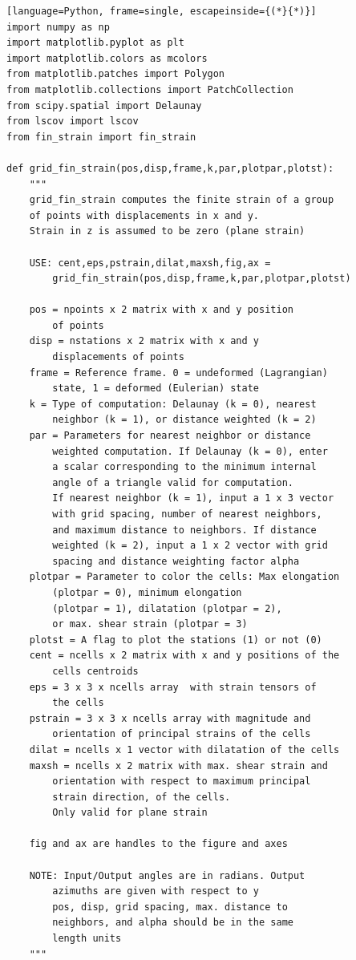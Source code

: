\documentclass[a4paper , 12pt]{book}
\begin{document}
\begin{center}
\begin{lstlisting}[language=Python, frame=single, escapeinside={(*}{*)}]
import numpy as np
import matplotlib.pyplot as plt
import matplotlib.colors as mcolors
from matplotlib.patches import Polygon
from matplotlib.collections import PatchCollection
from scipy.spatial import Delaunay
from lscov import lscov
from fin_strain import fin_strain

def grid_fin_strain(pos,disp,frame,k,par,plotpar,plotst):
	"""
	grid_fin_strain computes the finite strain of a group
	of points with displacements in x and y.
	Strain in z is assumed to be zero (plane strain)

	USE: cent,eps,pstrain,dilat,maxsh,fig,ax = 
		grid_fin_strain(pos,disp,frame,k,par,plotpar,plotst)

	pos = npoints x 2 matrix with x and y position
		of points
	disp = nstations x 2 matrix with x and y
		displacements of points
	frame = Reference frame. 0 = undeformed (Lagrangian)
		state, 1 = deformed (Eulerian) state
	k = Type of computation: Delaunay (k = 0), nearest
		neighbor (k = 1), or distance weighted (k = 2)
	par = Parameters for nearest neighbor or distance
		weighted computation. If Delaunay (k = 0), enter
		a scalar corresponding to the minimum internal
		angle of a triangle valid for computation.
		If nearest neighbor (k = 1), input a 1 x 3 vector
		with grid spacing, number of nearest neighbors,
		and maximum distance to neighbors. If distance
		weighted (k = 2), input a 1 x 2 vector with grid
		spacing and distance weighting factor alpha
	plotpar = Parameter to color the cells: Max elongation
		(plotpar = 0), minimum elongation
		(plotpar = 1), dilatation (plotpar = 2),
		or max. shear strain (plotpar = 3)
	plotst = A flag to plot the stations (1) or not (0)
	cent = ncells x 2 matrix with x and y positions of the
		cells centroids
	eps = 3 x 3 x ncells array	with strain tensors of
		the cells
	pstrain = 3 x 3 x ncells array with magnitude and
		orientation of principal strains of the cells
	dilat = ncells x 1 vector with dilatation of the cells
	maxsh = ncells x 2 matrix with max. shear strain and
		orientation with respect to maximum principal
		strain direction, of the cells.
		Only valid for plane strain
		
	fig and ax are handles to the figure and axes

	NOTE: Input/Output angles are in radians. Output
		azimuths are given with respect to y
		pos, disp, grid spacing, max. distance to
		neighbors, and alpha should be in the same
		length units
	"""
\end{lstlisting}
\end{center}
\end{document}
